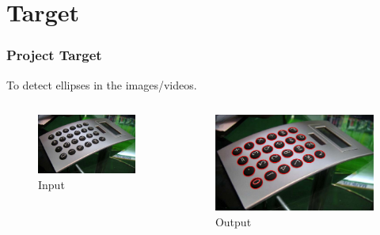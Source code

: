 \documentclass[aspectratio=169]{beamer}
\begin{document}
    \section{Target}
    \begin{frame}
        \frametitle{Project Target}
    
        To detect ellipses in the images/videos.
        \begin{columns}
            \begin{column}{.5\linewidth}
                \begin{figure}
                    \includegraphics[width=0.8\linewidth]{pic/source.jpg}
                    \caption{Input}
                \end{figure}
            \end{column}
            \begin{column}{.5\linewidth}
                \begin{figure}
                    \includegraphics[width=0.8\linewidth]{pic/ideaoutput.jpg}
                    \caption{Output}
                \end{figure}
            \end{column}
        \end{columns}
    
    \end{frame}
\end{document}
